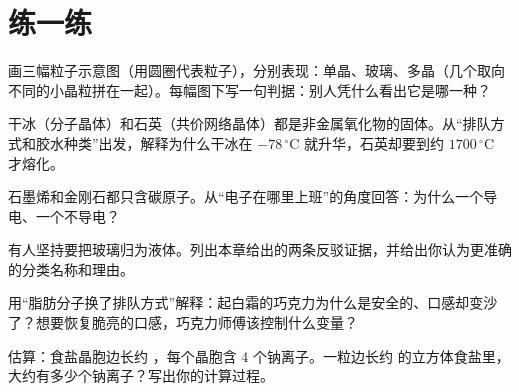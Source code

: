 \section*{练一练}

\begin{sikaoti}
\item 画三幅粒子示意图（用圆圈代表粒子），分别表现：单晶、玻璃、多晶（几个取向不同的小晶粒拼在一起）。每幅图下写一句判据：别人凭什么看出它是哪一种？
\item 干冰（分子晶体）和石英（共价网络晶体）都是非金属氧化物的固体。从“排队方式和胶水种类”出发，解释为什么干冰在 $-78\,^{\circ}\mathrm{C}$ 就升华，石英却要到约 $1700\,^{\circ}\mathrm{C}$ 才熔化。
\item 石墨烯和金刚石都只含碳原子。从“电子在哪里上班”的角度回答：为什么一个导电、一个不导电？
\item 有人坚持要把玻璃归为液体。列出本章给出的两条反驳证据，并给出你认为更准确的分类名称和理由。
\item 用“脂肪分子换了排队方式”解释：起白霜的巧克力为什么是安全的、口感却变沙了？想要恢复脆亮的口感，巧克力师傅该控制什么变量？
\item 估算：食盐晶胞边长约 ，每个晶胞含 4 个钠离子。一粒边长约  的立方体食盐里，大约有多少个钠离子？写出你的计算过程。
\end{sikaoti}
